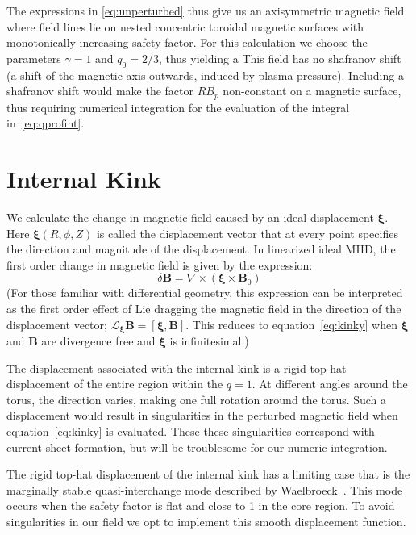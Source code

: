 \documentclass[%
superscriptaddress,
amsmath,amssymb,
aps,
pre,
floatfix,
]{revtex4-2}
\begin{document}
The expressions in \ref{eq:unperturbed} thus give us an axisymmetric magnetic field where field lines lie on nested concentric toroidal magnetic surfaces with monotonically increasing safety factor.
For this calculation we choose the parameters $\gamma=1$ and $q_0=2/3$, thus yielding a
This field has no shafranov shift (a shift of the magnetic axis outwards, induced by plasma pressure).
Including a shafranov shift would make the factor $RB_p$ non-constant on a magnetic surface, thus requiring numerical integration for the evaluation of the integral in~\ref{eq:qprofint}.

\section*{Internal Kink}
We calculate the change in magnetic field caused by an ideal displacement $\boldsymbol{\xi}$. 
Here $\boldsymbol{\xi}(R, \phi, Z)$ is called the displacement vector that at every point specifies the direction and magnitude of the displacement. 
In linearized ideal MHD, the first order change in magnetic field is given by the expression: 
\begin{equation}\label{eq:kinky}
    \delta \mathbf{B} = \nabla \times (\boldsymbol{\xi} \times \mathbf{B}_0)
\end{equation}
(For those familiar with differential geometry, this expression can be interpreted as the first order effect of Lie dragging the magnetic field in the direction of the displacement vector; $\mathcal{L}_{\boldsymbol{\xi}} \mathbf{B} = \left[\boldsymbol{\xi}, \mathbf{B}\right]$. This reduces to equation~\eqref{eq:kinky} when $\boldsymbol{\xi}$ and $\mathbf{B}$ are divergence free and $\boldsymbol{\xi}$ is infinitesimal.)

The displacement associated with the internal kink is a rigid top-hat displacement of the entire region within the $q=1$. 
At different angles around the torus, the direction varies, making one full rotation around the torus. 
Such a displacement would result in singularities in the perturbed magnetic field when equation~\eqref{eq:kinky} is evaluated. 
These these singularities correspond with current sheet formation, but will be troublesome for our numeric integration.

The rigid top-hat displacement of the internal kink has a limiting case that is the marginally stable quasi-interchange mode described by Waelbroeck~\cite{waelbroeck1989nonlinear}. 
This mode occurs when the safety factor is flat and close to 1 in the core region. 
To avoid singularities in our field we opt to implement this smooth displacement function. 
\end{document}
